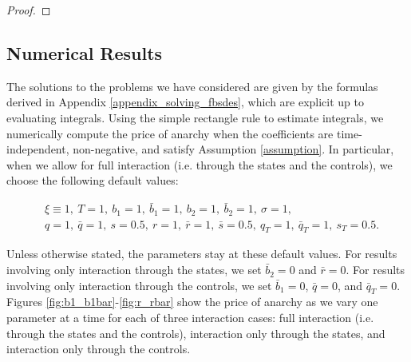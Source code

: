 \documentclass[11pt]{article}
\begin{document}
\begin{proof}
\end{proof}


\subsection{\textbf{Numerical Results}}
The solutions to the problems we have considered are given by the formulas derived in Appendix \ref{appendix_solving_fbsdes}, which are explicit up to evaluating integrals. Using the simple rectangle rule to estimate integrals, we numerically compute the price of anarchy when the coefficients are time-independent, non-negative, and satisfy Assumption \ref{assumption}. In particular, when we allow for full interaction (i.e. through the states and the controls), we choose the following default values:

\begin{equation*}
\begin{split}
    &\xi\equiv 1,\ T=1,\ b_1=1,\  \bar{b}_1=1,\ b_2=1,\ \bar{b}_2=1,\ \sigma=1, \\
    &q=1,\ \bar{q}=1,\ s=0.5,\ r=1,\ \bar{r}=1,\ \bar{s}=0.5,\ q_T=1,\  \bar{q}_T=1,\ s_T=0.5.
\end{split}
\end{equation*}

Unless otherwise stated, the parameters stay at these default values. For results involving only interaction through the states, we set $\bar{b}_2=0$ and $\bar{r}=0$. For results involving only interaction through the controls, we set $\bar{b}_1=0$, $\bar{q}=0$, and $\bar{q}_T=0$. Figures \ref{fig:b1_b1bar}-\ref{fig:r_rbar} show the price of anarchy as we vary one parameter at a time for each of three interaction cases: full interaction (i.e. through the states and the controls), interaction only through the states, and interaction only through the controls.
\end{document}
